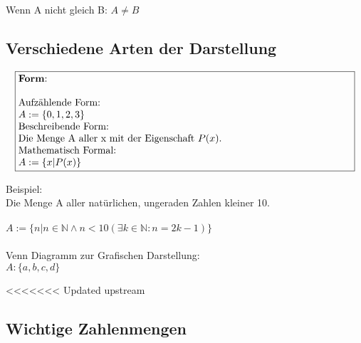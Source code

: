 \documentclass[../gruppenarbeit_1.tex]{subfiles}
\begin{document}
Wenn A nicht gleich B: $A \ne B$

\newpage

\subsection{Verschiedene Arten der Darstellung}

\begin{align}
    \fbox{\begin{minipage}{11.8cm}
      \textbf{Form}:\\
      \\
      Aufzählende Form:\\
      $A := \{0,1,2,3\}$\\
      Beschreibende Form:\\
      Die Menge A aller x mit der Eigenschaft $P(x)$.\\
      Mathematisch Formal:\\
      $A := \{x | P(x)\}$
    \end{minipage}}
\end{align}

Beispiel:\\
Die Menge A aller natürlichen, ungeraden Zahlen kleiner 10.\\
\\
$A := \{n | n \in \mathbb{N} \wedge n < 10 (\exists k \in \mathbb{N} : n = 2k-1)\}$\\
\\

Venn Diagramm zur Grafischen Darstellung:\\
$A : \{a,b,c,d\}$\\


<<<<<<< Updated upstream
\subsection{Wichtige Zahlenmengen}
\end{document}
